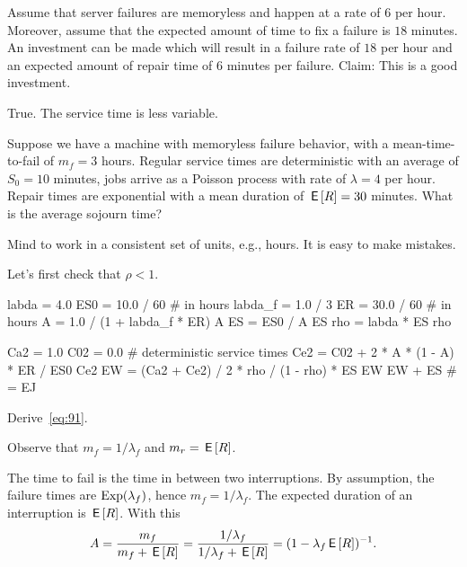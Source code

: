 \documentclass[stochastic-or.tex]{subfiles}
\begin{document}
\begin{truefalse}
Assume that server failures are memoryless and happen at a rate of $6$ per hour. Moreover, assume that the expected amount of time to fix a failure is $18$ minutes. An investment can be made which will result in a failure rate of $18$ per hour and an expected amount of repair time of $6$ minutes per failure.
Claim: This is a good investment.
    \begin{solution}
        True. The service time is less variable.
    \end{solution}
\end{truefalse}



\begin{exercise}\label{ex:l-157}
Suppose we have a machine with memoryless failure behavior, with a mean-time-to-fail of $m_{f}=3$ hours.
Regular service times are deterministic with an average of $S_{0}=10$ minutes, jobs arrive as a Poisson process with rate of $\lambda=4$ per hour.
Repair times are exponential with a mean duration of $\,\mathsf{E}\left[R\right] = 30$ minutes.
What is the average sojourn time?
\begin{hint}
 Mind to work in a consistent set of units, e.g., hours. It is easy to make mistakes.
\end{hint}
\begin{solution}
  Let's first check that $\rho< 1$.
\begin{pyconsole}
labda = 4.0
ES0 = 10.0 / 60  # in hours
labda_f = 1.0 / 3
ER = 30.0 / 60  # in hours
A = 1.0 / (1 + labda_f * ER)
A
ES = ES0 / A
ES
rho = labda * ES
rho
\end{pyconsole}
\begin{pyconsole}
Ca2 = 1.0
C02 = 0.0  # deterministic service times
Ce2 = C02 + 2 * A * (1 - A) * ER / ES0
Ce2
EW = (Ca2 + Ce2) / 2 * rho / (1 - rho) * ES
EW
EW + ES  # = EJ
\end{pyconsole}
\end{solution}
\end{exercise}

\begin{exercise}\label{ex:80}
 Derive~\cref{eq:91}.
\begin{hint}
 Observe that $m_f = 1/\lambda_f$ and $m_r = \,\mathsf{E}\left[R\right]$.
\end{hint}
\begin{solution}
  The time to fail is the time in between two interruptions.
  By assumption, the failure times are $\mathrm{Exp}(\lambda_f)$, hence $m_f = 1/\lambda_f$.
  The expected duration of an interruption is $\,\mathsf{E}\left[R\right]$.   With this
\begin{equation*}
 A=\frac{m_f}{m_f + \,\mathsf{E}\left[R\right]}=\frac{1/\lambda_f }{1/\lambda_f + \,\mathsf{E}\left[R\right]} = (1-\lambda_{f} \,\mathsf{E}\left[R\right])^{-1}.
\end{equation*}
\end{solution}
\end{exercise}
\end{document}
